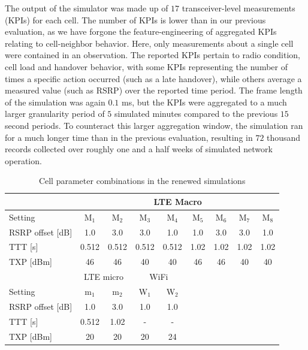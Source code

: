 			The output of the simulator was made up of $17$ transceiver-level measurements (\acp{KPI}) for each cell.
			The number of \acp{KPI} is lower than in our previous evaluation, as we have forgone the feature-engineering of aggregated \acp{KPI} relating to cell-neighbor behavior.
			Here, only measurements about a single cell were contained in an observation.
			The reported \acp{KPI} pertain to radio condition, cell load and handover behavior, with some \acp{KPI} representing the number of times a specific action occurred (such as a late handover), while others average a measured value (such as \ac{RSRP}) over the reported time period.
			The frame length of the simulation was again $0.1$ ms, but the \acp{KPI} were aggregated to a much larger granularity period of $5$ simulated minutes compared to the previous $15$ second periods.
			To counteract this larger aggregation window, the simulation ran for a much longer time than in the previous evaluation, resulting in $72$ thousand records collected over roughly one and a half weeks of simulated network operation.
			
			\begin{table}[t]
				\renewcommand*{\arraystretch}{1.2}
				\centering
				\begin{tabular} {l|c c c c c c c c}
					& \multicolumn{8}{c}{LTE Macro} \\ 
					\hline
					Setting 			& M$_{1}$	& M$_{2}$	& M$_{3}$	&	M$_{4}$	& M$_{5}$	& M$_{6}$	& M$_{7}$	& M$_{8}$	\\
					\hline 
					RSRP offset [dB] 	& 1.0		& 3.0		& 3.0		& 1.0		& 1.0		& 3.0		& 3.0		& 1.0		\\
					TTT [s]				& 0.512		& 0.512		& 0.512		& 0.512		& 1.02		& 1.02		& 1.02		& 1.02		\\
					TXP [dBm]			& 46		& 46		& 40		& 40		& 46		& 46		& 40		& 40		\\
					\hline						
					& \multicolumn{2}{c|}{LTE micro} 			& \multicolumn{2}{c}{WiFi} 			& & & & \\
					\cline{1-5}
					Setting 			& m$_1$	& \multicolumn{1}{c|}{m$_2$}		& W$_1$	& \multicolumn{1}{c}{W$_2$}	& & & & \\
					\cline{1-5} 
					RSRP offset [dB] 	& 1.0	& \multicolumn{1}{c|}{3.0}			& 1.0	& \multicolumn{1}{c}{1.0}	& & & & \\
					TTT [s]				& 0.512	& \multicolumn{1}{c|}{1.02}			& -		& \multicolumn{1}{c}{-}		& & & & \\
					TXP [dBm]			& 20	& \multicolumn{1}{c|}{20}			& 20	& \multicolumn{1}{c}{24}	& & & & \\
				\end{tabular}
				\caption[Cell parameters in the renewed EMA simulation]{Cell parameter combinations in the renewed simulations}
				\label{tab:cell_params_2}
			\end{table}
			
